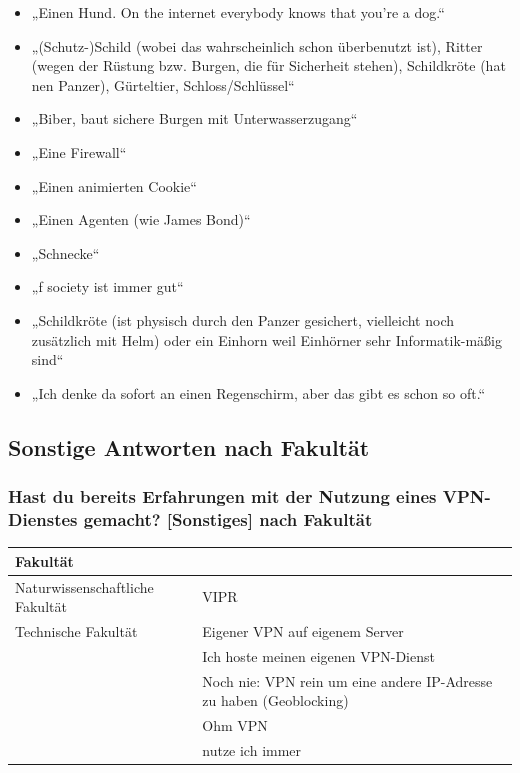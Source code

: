\documentclass[german,report]{i1thesis}
\begin{document}
\begin{itemize}
    \item „Einen Hund. On the internet everybody knows that you're a dog.“
    \item „(Schutz-)Schild (wobei das wahrscheinlich schon überbenutzt ist), Ritter (wegen der Rüstung bzw. Burgen, die für Sicherheit stehen), Schildkröte (hat nen Panzer), Gürteltier, Schloss/Schlüssel“
    \item „Biber, baut sichere Burgen mit Unterwasserzugang“
    \item „Eine Firewall“
    \item „Einen animierten Cookie“
    \item „Einen Agenten (wie James Bond)“
    \item „Schnecke“
    \item „f society ist immer gut“
    \item „Schildkröte (ist physisch durch den Panzer gesichert, vielleicht noch zusätzlich mit Helm) oder ein Einhorn weil Einhörner sehr Informatik-mäßig sind“
    \item „Ich denke da sofort an einen Regenschirm, aber das gibt es schon so oft.“
\end{itemize}

\subsection{Sonstige Antworten nach Fakultät}
\label{sec:sonstige_antworten}

\subsubsection*{Hast du bereits Erfahrungen mit der Nutzung eines VPN-Dienstes gemacht? [Sonstiges] nach Fakultät}
\begin{longtable}{|p{5cm}|p{9cm}|}
\hline
Fakultät & \\
\hline
Naturwissenschaftliche Fakultät & VIPR \\
\hline
Technische Fakultät & Eigener VPN auf eigenem Server \\ \cline{2-2}
 & Ich hoste meinen eigenen VPN-Dienst \\ \cline{2-2}
 & Noch nie: VPN rein um eine andere IP-Adresse zu haben (Geoblocking) \\ \cline{2-2}
 & Ohm VPN \\ \cline{2-2}
 & nutze ich immer \\
\hline
\end{longtable}
\end{document}

